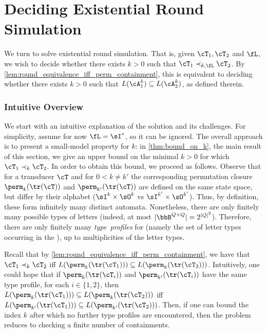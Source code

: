 \chapter{Deciding Existential Round Simulation}
\label{chap:deciding_existential_round_sim}

We turn to solve existential round simulation. That is, given $\cT_1,\cT_2$ and $\fL$, we wish to decide whether there exists $k>0$ such that $\cT_1\prec_{k,\fL} \cT_2$. 
By \cref{lem:round_equivalence_iff_perm_containment}, this is equivalent to deciding whether there exists $k>0$ such that $L(\cA^k_1)\subseteq L(\cA^k_2)$, as defined therein.

\subsection{Intuitive Overview}
\label{sec:intuitive_overview}
We start with an intuitive explanation of the solution and its challenges. For simplicity, assume for now $\fL=\sI^*$, so it can be ignored. The overall approach is to present a small-model property for $k$: in \cref{thm:bound_on_k}, the main result of this section, we give an upper bound on the minimal $k>0$ for which $\cT_1\prec_{k} \cT_2$. In order to obtain this bound, we proceed as follows. Observe that for a transducer $\cT$ and for $0<k\neq k'$ the corresponding permutation closure \NFAs $\perm_k(\tr(\cT))$ and $\perm_{k'}(\tr(\cT))$ are defined on the same state space, but differ by their alphabet ($\sI^{k}\times \sO^{k}$ vs $\sI^{k'}\times \sO^{k'}$). Thus, by definition, these \NFAs form infinitely many distinct automata. Nonetheless, there are only finitely many possible types of letters (indeed, at most $|\bbB^{Q\times Q}|=2^{|Q|^2}$). Therefore, there are only finitely many \emph{type~profiles} for \NFAs (namely the set of letter types occurring in the \NFA), up to multiplicities of the letter types.

Recall that by \cref{lem:round_equivalence_iff_perm_containment}, we have that $\cT_1\prec_k \cT_2$ iff $L(\perm_k(\tr(\cT_1)))\subseteq L(\perm_{k}(\tr(\cT_2)))$.
Intuitively, one could hope that if $\perm_k(\tr(\cT_i))$ and $\perm_{k'}(\tr(\cT_i))$ have the same type profile, for each $i\in \{1,2\}$, then $L(\perm_k(\tr(\cT_1)))\subseteq L(\perm_{k}(\tr(\cT_2)))$ iff $L(\perm_{k'}(\tr(\cT_1)))\subseteq L(\perm_{k'}(\tr(\cT_2)))$. Then, if one can bound the index $k$ after which no further type profiles are encountered, then the problem reduces to checking a finite number of containments.

